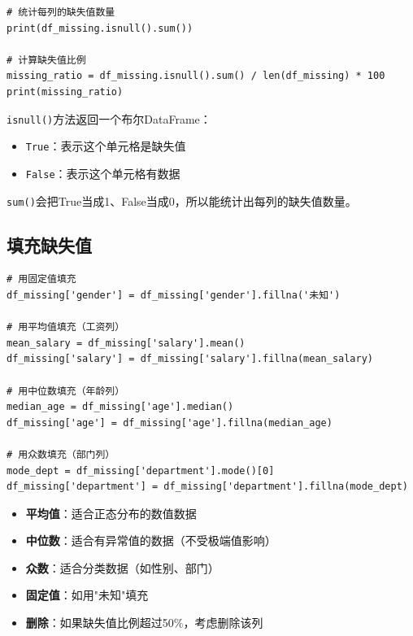 \documentclass[12pt,a4paper]{article}
\begin{document}
\begin{lstlisting}[caption={检测缺失值}]
# 统计每列的缺失值数量
print(df_missing.isnull().sum())

# 计算缺失值比例
missing_ratio = df_missing.isnull().sum() / len(df_missing) * 100
print(missing_ratio)
\end{lstlisting}

\begin{knowledgebox}
\texttt{isnull()}方法返回一个布尔DataFrame：
\begin{itemize}
    \item \texttt{True}：表示这个单元格是缺失值
    \item \texttt{False}：表示这个单元格有数据
\end{itemize}

\texttt{sum()}会把True当成1、False当成0，所以能统计出每列的缺失值数量。
\end{knowledgebox}

\subsection{填充缺失值}

\begin{lstlisting}[caption={填充缺失值的方法}]
# 用固定值填充
df_missing['gender'] = df_missing['gender'].fillna('未知')

# 用平均值填充（工资列）
mean_salary = df_missing['salary'].mean()
df_missing['salary'] = df_missing['salary'].fillna(mean_salary)

# 用中位数填充（年龄列）
median_age = df_missing['age'].median()
df_missing['age'] = df_missing['age'].fillna(median_age)

# 用众数填充（部门列）
mode_dept = df_missing['department'].mode()[0]
df_missing['department'] = df_missing['department'].fillna(mode_dept)
\end{lstlisting}

\begin{knowledgebox}
\begin{itemize}
    \item \textbf{平均值}：适合正态分布的数值数据
    \item \textbf{中位数}：适合有异常值的数据（不受极端值影响）
    \item \textbf{众数}：适合分类数据（如性别、部门）
    \item \textbf{固定值}：如用"未知"填充
    \item \textbf{删除}：如果缺失值比例超过50\%，考虑删除该列
\end{itemize}
\end{knowledgebox}
\end{document}
